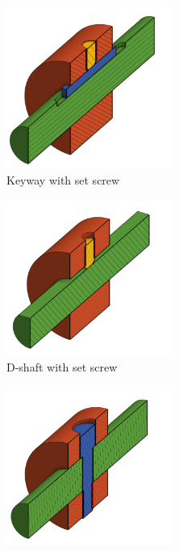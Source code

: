 \documentclass[10pt,letterpaper]{book}
\begin{document}
	\begin{figure}[H]
		\centering
		\begin{subfigure}[b]{.32\linewidth}
			\includegraphics[width=0.6\textwidth]{imgs/keyedshaft.png}
			\caption{Keyway with set screw}
		\end{subfigure}
		\begin{subfigure}[b]{.32\linewidth}
			\includegraphics[width=0.6\textwidth]{imgs/dshaft.png}
			\caption{D-shaft with set screw}
		\end{subfigure}
		\begin{subfigure}[b]{.32\linewidth}
			\includegraphics[width=0.6\textwidth]{imgs/pinnedshaft.png}

\end{subfigure}
\end{figure}
\end{document}
